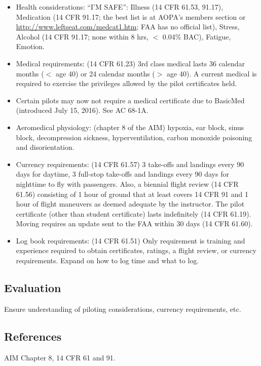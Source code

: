 \begin{itemize}
  \item Health considerations: ``I'M SAFE'': Illness (14 CFR 61.53, 91.17),
    Medication (14 CFR 91.17; the best list is at AOPA's members section or
    \url{http://www.leftseat.com/medcat1.htm}; FAA has no official list),
    Stress, Alcohol (14 CFR 91.17; none within 8 hrs, $<$ 0.04\% BAC), Fatigue,
    Emotion.

  \item Medical requirements: (14 CFR 61.23) 3rd class medical lasts 36
    calendar months ($<$ age 40) or 24 calendar months ($>$ age 40). A current
    medical is required to exercise the privileges allowed by the pilot
    certificates held.

  \item Certain pilots may now not require a medical certificate due to
    BasicMed (introduced July 15, 2016). See AC 68-1A.

  \item Aeromedical physiology: (chapter 8 of the AIM) hypoxia, ear block,
    sinus block, decompression sickness, hyperventilation, carbon monoxide
    poisoning and disorientation.

  \item Currency requirements: (14 CFR 61.57) 3 take-offs and landings every 90
    days for daytime, 3 full-stop take-offs and landings every 90 days for
    nighttime to fly with passengers. Also, a biennial flight review (14 CFR
    61.56) consisting of 1 hour of ground that at least covers 14 CFR 91 and 1
    hour of flight maneuvers as deemed adequate by the instructor. The pilot
    certificate (other than student certificate) lasts indefinitely (14 CFR
    61.19). Moving requires an update sent to the FAA within 30 days (14 CFR
    61.60).

  \item Log book requirements: (14 CFR 61.51) Only requirement is training and
    experience required to obtain certificates, ratings, a flight review, or
    currency requirements. Expand on how to log time and what to log.

\end{itemize}

\subsection{Evaluation}

Ensure understanding of piloting considerations, currency requirements, etc.

\subsection{References}

AIM Chapter 8, 14 CFR 61 and 91.

